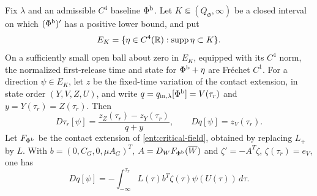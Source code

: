 \begin{lemma}
\label{lem:profile-variation}
Fix $\lambda$ and an admissible $C^4$ baseline $\Phi^{\rm b}$.
Let $K\Subset(Q_\Phi,\infty)$ be a closed interval on which
$(\Phi^{\rm b})'$ has a positive lower bound, and put
\[
 E_K=\{\eta\in C^4(\mathbb R):\operatorname{supp}\eta\subset K\}.
\]
On a sufficiently small open ball about zero in $E_K$, equipped
with its $C^4$ norm, the normalized first-release time and state
for $\Phi^{\rm b}+\eta$ are Fr\'echet $C^1$.
For a direction $\psi\in E_K$, let $z$ be the fixed-time variation
of the contact extension, in state order $(Y,V,Z,U)$, and write
$q=q_{\rm in,\lambda}[\Phi^{\rm b}]=V(\tau_r)$ and
$y=Y(\tau_r)=Z(\tau_r)$. Then
\begin{equation}
 D\tau_r[\psi]=\frac{z_Z(\tau_r)-z_Y(\tau_r)}{q+y},
 \qquad Dq[\psi]=z_V(\tau_r).
 \label{ent:profile-event-derivative}
\end{equation}
Let $F_{\Phi^{\rm b}}$ be the contact extension of
\eqref{ent:critical-field}, obtained by replacing $L_+$ by $L$.
With $b=(0,C_G,0,\mu A_G)^T$,
$A=D_WF_{\Phi^{\rm b}}(\overline W)$ and
$\zeta'=-A^T\zeta$, $\zeta(\tau_r)=e_V$, one has
\begin{equation}
 Dq[\psi]=-\int_{-\infty}^{\tau_r}
           L(\tau)b^T\zeta(\tau)\psi(U(\tau))\,d\tau.
 \label{ent:profile-response}
\end{equation}
\end{lemma}
